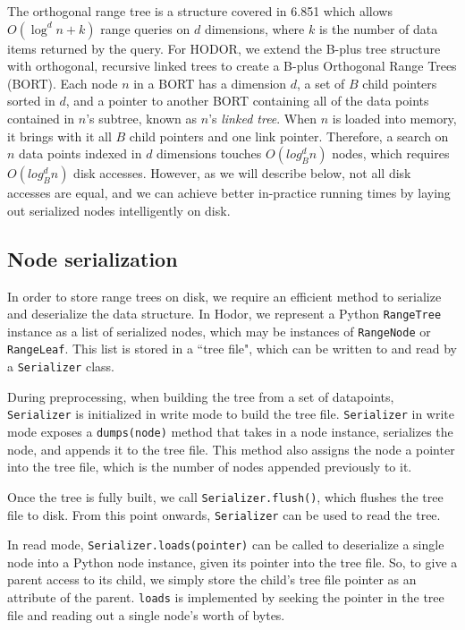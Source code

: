\documentclass[11pt, oneside]{article}
\begin{document}
The orthogonal range tree is a structure covered in 6.851 which allows $O(\log^d
n + k)$ range queries on $d$ dimensions, where $k$ is the number of data items
returned by the query. For HODOR, we extend the B-plus tree structure with
orthogonal, recursive linked trees to create a B-plus Orthogonal Range Trees
(BORT). Each node $n$ in a BORT has a dimension $d$, a set of $B$ child pointers
sorted in $d$, and a pointer to another BORT containing all of the data points
contained in $n$'s subtree, known as $n$'s \textit{linked tree}.  When $n$ is
loaded into memory, it brings with it all $B$ child pointers and one link
pointer.  Therefore, a search on $n$ data points indexed in $d$ dimensions
touches $O(log^d_B n)$ nodes, which requires $O(log^d_B n)$ disk accesses.
However, as we will describe below, not all disk accesses are equal, and we can
achieve better in-practice running times by laying out serialized nodes
intelligently on disk.

\subsection{Node serialization}

In order to store range trees on disk, we require an efficient method to
serialize and deserialize the data structure. In Hodor, we represent a Python
\texttt{RangeTree} instance as a list of serialized nodes, which may be
instances of \texttt{RangeNode} or \texttt{RangeLeaf}. This list is stored in a
``tree file", which can be written to and read by a \texttt{Serializer} class. 

During preprocessing, when building the tree from a set of datapoints,
\texttt{Serializer} is initialized in write mode to build the tree file.
\texttt{Serializer} in write mode exposes a \texttt{dumps(node)} method that
takes in a node instance, serializes the node, and appends it to the tree file.
This method also assigns the node a pointer into the tree file, which
is the number of nodes appended previously to it. 

Once the tree is fully built, we call \texttt{Serializer.flush()}, which
flushes the tree file to disk. From this point onwards, \texttt{Serializer} can
be used to read the tree.

In read mode, \texttt{Serializer.loads(pointer)} can be called to deserialize a
single node into a Python node instance, given its pointer into the tree file.
So, to give a parent access to its child, we simply store the child's tree file
pointer as an attribute of the parent. \texttt{loads} is implemented by seeking
the pointer in the tree file and reading out a single node's worth of bytes.
\end{document}
